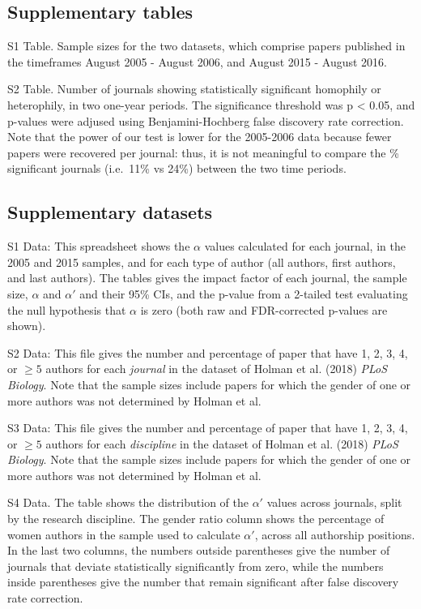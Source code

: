 \documentclass[12pt,]{article}
\begin{document}
\subsection{Supplementary tables}\label{supplementary-tables}

S1 Table. Sample sizes for the two datasets, which comprise papers
published in the timeframes August 2005 - August 2006, and August 2015 -
August 2016.

S2 Table. Number of journals showing statistically significant homophily
or heterophily, in two one-year periods. The significance threshold was
p \textless{} 0.05, and p-values were adjused using Benjamini-Hochberg
false discovery rate correction. Note that the power of our test is
lower for the 2005-2006 data because fewer papers were recovered per
journal: thus, it is not meaningful to compare the \% significant
journals (i.e.~11\% vs 24\%) between the two time periods.

\subsection{Supplementary datasets}\label{supplementary-datasets}

S1 Data: This spreadsheet shows the \(\alpha\) values calculated for
each journal, in the 2005 and 2015 samples, and for each type of author
(all authors, first authors, and last authors). The tables gives the
impact factor of each journal, the sample size, \(\alpha\) and
\(\alpha'\) and their 95\% CIs, and the p-value from a 2-tailed test
evaluating the null hypothesis that \(\alpha\) is zero (both raw and
FDR-corrected p-values are shown).

S2 Data: This file gives the number and percentage of paper that have 1,
2, 3, 4, or \({\ge}5\) authors for each \emph{journal} in the dataset of
Holman et al. (2018) \emph{PLoS Biology}. Note that the sample sizes
include papers for which the gender of one or more authors was not
determined by Holman et al.

S3 Data: This file gives the number and percentage of paper that have 1,
2, 3, 4, or \({\ge}5\) authors for each \emph{discipline} in the dataset
of Holman et al. (2018) \emph{PLoS Biology}. Note that the sample sizes
include papers for which the gender of one or more authors was not
determined by Holman et al.

S4 Data. The table shows the distribution of the \(\alpha'\) values
across journals, split by the research discipline. The gender ratio
column shows the percentage of women authors in the sample used to
calculate \(\alpha'\), across all authorship positions. In the last two
columns, the numbers outside parentheses give the number of journals
that deviate statistically significantly from zero, while the numbers
inside parentheses give the number that remain significant after false
discovery rate correction.
\end{document}
